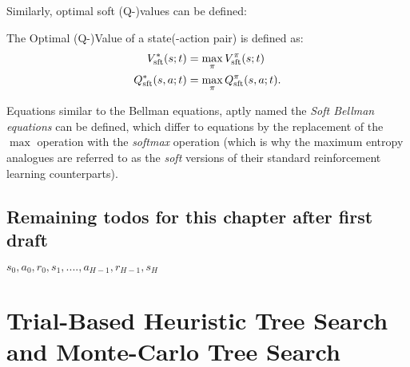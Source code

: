         Similarly, optimal soft (Q-)values can be defined:
        \begin{defn}
            \label{def:optimal_sft_value}
            \label{def:optimal_sft_q_value}
            The \textnormal{Optimal (Q-)Value} of a state(-action pair) is defined as:
            \begin{align}
                V_{\textnormal{sft}}^*(s;t) &= \max_{\pi} V_{\textnormal{sft}}^{\pi}(s;t) \\
                Q_{\textnormal{sft}}^*(s,a;t) &= \max_{\pi} Q_{\textnormal{sft}}^{\pi}(s,a;t).
            \end{align}
        \end{defn}

        Equations similar to the Bellman equations, aptly named the \textit{Soft Bellman equations} can be defined, which differ to equations  by the replacement of the $\max$ operation with the \textit{softmax} operation (which is why the maximum entropy analogues are referred to as the \textit{soft} versions of their standard reinforcement learning counterparts).





    \subsection{Remaining todos for this chapter after first draft}


         $s_0, a_0, r_0, s_1,...., a_{H-1}, r_{H-1}, s_H$




\section{Trial-Based Heuristic Tree Search and Monte-Carlo Tree Search}
\label{sec:2-2-thts}

